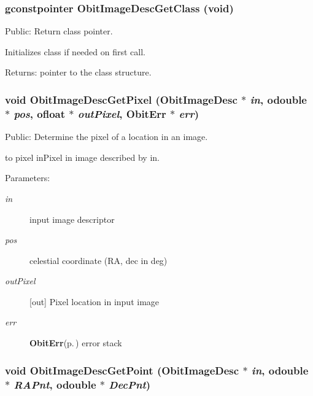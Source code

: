 \subsubsection{\setlength{\rightskip}{0pt plus 5cm}gconstpointer Obit\-Image\-Desc\-Get\-Class (void)}\label{ObitImageDesc_8h_a11}


Public: Return class pointer. 

Initializes class if needed on first call. \begin{Desc}
\item[Returns:]pointer to the class structure. \end{Desc}
\subsubsection{\setlength{\rightskip}{0pt plus 5cm}void Obit\-Image\-Desc\-Get\-Pixel ({\bf Obit\-Image\-Desc} $\ast$ {\em in}, {\bf odouble} $\ast$ {\em pos}, {\bf ofloat} $\ast$ {\em out\-Pixel}, {\bf Obit\-Err} $\ast$ {\em err})}\label{ObitImageDesc_8h_a19}


Public: Determine the pixel of a location in an image. 

to pixel in\-Pixel in image described by in. \begin{Desc}
\item[Parameters:]
\begin{description}
\item[{\em in}]input image descriptor \item[{\em pos}]celestial coordinate (RA, dec in deg) \item[{\em out\-Pixel}][out] Pixel location in input image \item[{\em err}]{\bf Obit\-Err}{\rm (p.\,\pageref{structObitErr})} error stack \end{description}
\end{Desc}
\subsubsection{\setlength{\rightskip}{0pt plus 5cm}void Obit\-Image\-Desc\-Get\-Point ({\bf Obit\-Image\-Desc} $\ast$ {\em in}, {\bf odouble} $\ast$ {\em RAPnt}, {\bf odouble} $\ast$ {\em Dec\-Pnt})}\label{ObitImageDesc_8h_a22}


